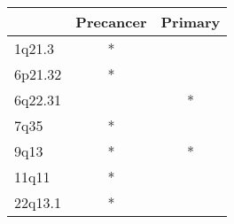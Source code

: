 \begin{tabular}{lcc}
\toprule
{} & Precancer & Primary \\
\midrule
1q21.3  &         * &         \\
6p21.32 &         * &         \\
6q22.31 &           &       * \\
7q35    &         * &         \\
9q13    &         * &       * \\
11q11   &         * &         \\
22q13.1 &         * &         \\
\bottomrule
\end{tabular}
